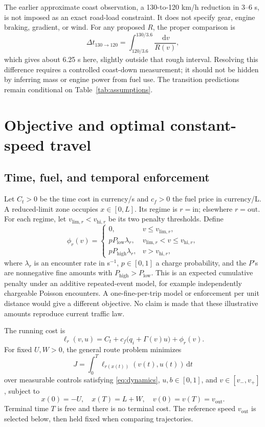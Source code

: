 \documentclass[10pt,a4paper]{article}
\newcommand{\dd}{\,\mathrm{d}}
\newcommand{\out}{\mathrm{out}}
\newcommand{\inn}{\mathrm{in}}
\begin{document}
The earlier approximate coast observation, a 130-to-120 km/h reduction in 3--6 s, is not imposed as an exact road-load constraint. It does not specify gear, engine braking, gradient, or wind. For any proposed $R$, the proper comparison is
\begin{equation}
\Delta t_{130\to120}=\int_{120/3.6}^{130/3.6}\frac{\dd v}{R(v)},
\label{eq:coastmeasurement}
\end{equation}
which gives about 6.25 s here, slightly outside that rough interval. Resolving this difference requires a controlled coast-down measurement; it should not be hidden by inferring mass or engine power from fuel use. The transition predictions remain conditional on Table~\ref{tab:assumptions}.

\section{Objective and optimal constant-speed travel}
\label{sec:objective}
\subsection{Time, fuel, and temporal enforcement}
Let $C_t>0$ be the time cost in currency/s and $c_f>0$ the fuel price in currency/L. A reduced-limit zone occupies $x\in[0,L]$. Its regime is $r=\inn$; elsewhere $r=\out$. For each regime, let $v_{\mathrm{lim},r}<v_{\mathrm{hi},r}$ be its two penalty thresholds. Define
\begin{equation}
\phi_r(v)=
\begin{cases}
0,&v\le v_{\mathrm{lim},r},\\
pP_{\mathrm{low}}\lambda_r,&v_{\mathrm{lim},r}<v\le v_{\mathrm{hi},r},\\
pP_{\mathrm{high}}\lambda_r,&v>v_{\mathrm{hi},r},
\end{cases}
\label{eq:fines}
\end{equation}
where $\lambda_r$ is an encounter rate in s$^{-1}$, $p\in[0,1]$ a charge probability, and the $P$'s are nonnegative fine amounts with $P_{\mathrm{high}}>P_{\mathrm{low}}$. This is an expected cumulative penalty under an additive repeated-event model, for example independently chargeable Poisson encounters. A one-fine-per-trip model or enforcement per unit distance would give a different objective. No claim is made that these illustrative amounts reproduce current traffic law.

The running cost is
\begin{equation}
\ell_r(v,u)=C_t+c_f\bigl(q_i+\Gamma(v)u\bigr)+\phi_r(v).
\label{eq:running}
\end{equation}
For fixed $U,W>0$, the general route problem minimizes
\begin{equation}
J=\int_0^T\ell_{r(x(t))}(v(t),u(t))\dd t
\label{eq:objective}
\end{equation}
over measurable controls satisfying \eqref{eq:dynamics}, $u,b\in[0,1]$, and $v\in[v_-,v_+]$, subject to
\begin{equation}
x(0)=-U,\quad x(T)=L+W,\quad v(0)=v(T)=v_{\out}.
\end{equation}
Terminal time $T$ is free and there is no terminal cost. The reference speed $v_{\out}$ is selected below, then held fixed when comparing trajectories.
\end{document}
